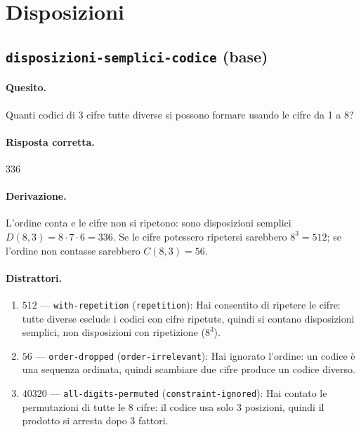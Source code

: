 
\section{Disposizioni}

\subsection{\texorpdfstring{\texttt{disposizioni-semplici-codice} (base)}{disposizioni-semplici-codice (base)}}

\paragraph{Quesito.} Quanti codici di 3 cifre tutte diverse si possono formare usando le cifre da 1 a 8?

\paragraph{Risposta corretta.} $336$

\paragraph{Derivazione.} L'ordine conta e le cifre non si ripetono: sono disposizioni semplici $D(8,3) = 8 \cdot  7 \cdot  6 = 336$. Se le cifre potessero ripetersi sarebbero $8^{3} = 512$; se l'ordine non contasse sarebbero $C(8,3) = 56$.

\paragraph{Distrattori.}
\begin{enumerate}
  \item $512$ --- \texttt{with-repetition} (\texttt{repetition}): Hai consentito di ripetere le cifre: \guillemotleft{}tutte diverse\guillemotright{} esclude i codici con cifre ripetute, quindi si contano disposizioni semplici, non disposizioni con ripetizione ($8^{3}$).
  \item $56$ --- \texttt{order-dropped} (\texttt{order-irrelevant}): Hai ignorato l'ordine: un codice è una sequenza ordinata, quindi scambiare due cifre produce un codice diverso.
  \item $40320$ --- \texttt{all-digits-permuted} (\texttt{constraint-ignored}): Hai contato le permutazioni di tutte le 8 cifre: il codice usa solo 3 posizioni, quindi il prodotto si arresta dopo 3 fattori.
\end{enumerate}

